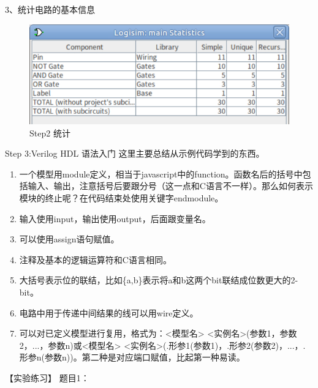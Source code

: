 \documentclass[UTF8]{ctexart}
\begin{document}
3、统计电路的基本信息
\newline
\begin{figure}[h!]
    \centering
    \includegraphics{S2_3.PNG}
    \caption{Step2 统计}
\end{figure}
Step 3:Verilog HDL 语法入门
\newline
这里主要总结从示例代码学到的东西。
\begin{enumerate}
    \item 一个模型用module定义，相当于javascript中的function。函数名后的括号中包括输入、输出，注意括号后要跟分号（这一点和C语言不一样）。那么如何表示模块的终止呢？在代码结束处使用关键字endmodule。
    \item 输入使用input，输出使用output，后面跟变量名。
    \item 可以使用assign语句赋值。
    \item 注释及基本的逻辑运算符和C语言相同。
    \item 大括号表示位的联结，比如\{a,b\}表示将a和b这两个bit联结成位数更大的2-bit。
    \item 电路中用于传递中间结果的线可以用wire定义。
    \item 可以对已定义模型进行复用，格式为：<模型名> <实例名>(参数1，参数2，...，参数n)或<模型名> <实例名>(.形参1(参数1)，.形参2(参数2)，...，.形参n(参数n))。第二种是对应端口赋值，比起第一种易读。
\end{enumerate}
【实验练习】
\newline
题目1：
\newline
\end{document}
